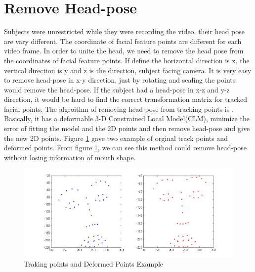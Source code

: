 \section{Remove Head-pose}
Subjects were unrestricted while they were recording the video, their head pose are vary different. The coordinate of facial feature points are different for each video frame. In order to unite the head, we need to remove the head pose from the coordinates of facial feature points.  If define the horizontal direction is x, the vertical direction is y and z is the direction, subject facing camera. It is very easy to remove head-pose in x-y direction, just by rotating and scaling the points would remove the head-pose. If the subject had a head-pose in x-z and y-z direction, it would be hard to find the correct transformation matrix for tracked facial points. The algroithm of removing head-pose from tracking points is \cite{saragih2011deformable}. Basically, it has a deformable 3-D Constrained Local Model(CLM), minimize the error of fitting the model and the 2D points and then remove head-pose and give the new 2D points. Figure \ref{fig:RHP} gave two example of orginal track points and deformed points. From figure \ref{fig:RHP}, we can see this method could remove head-pose without losing information of mouth shape.
\begin{figure}[ht]
\centering
\includegraphics[width=.6\textwidth]{imgs/160954_Deform_233.png}
\caption{Traking points and Deformed Points Example}
\label{fig:RHP}
\end{figure}
